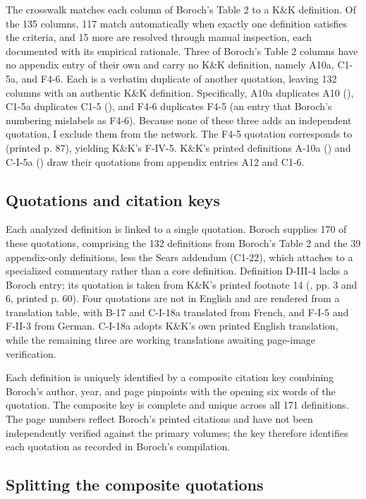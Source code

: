 \documentclass[11pt]{article}
\begin{document}
The crosswalk matches each column of Boroch's Table 2 to a K\&K definition. Of the 135 columns, 117 match automatically when exactly one definition satisfies the criteria, and 15 more are resolved through manual inspection, each documented with its empirical rationale. Three of Boroch's Table 2 columns have no appendix entry of their own and carry no K\&K definition, namely A10a, C1-5a, and F4-6. Each is a verbatim duplicate of another quotation, leaving 132 columns with an authentic K\&K definition. Specifically, A10a duplicates A10 (\citealt{winston1933}), C1-5a duplicates C1-5 (\citealt{firth1939}), and F4-6 duplicates F4-5 (an entry that Boroch's numbering mislabels as F4-6). Because none of these three adds an independent quotation, I exclude them from the network. The F4-5 quotation corresponds to \citealt{kluckhohnkelly1945a} (printed p. 87), yielding K\&K's F-IV-5. K\&K's printed definitions A-10a (\citealt{lowie1937}) and C-I-5a (\citealt{lynd1940}) draw their quotations from appendix entries A12 and C1-6.

\subsection{Quotations and citation keys}

Each analyzed definition is linked to a single quotation. Boroch supplies 170 of these quotations, comprising the 132 definitions from Boroch's Table 2 and the 39 appendix-only definitions, less the Sears addendum (C1-22), which attaches to a specialized commentary rather than a core definition. Definition D-III-4 lacks a Boroch entry; its quotation is taken from K\&K's printed footnote 14 (\citealt{roberts1951}, pp. 3 and 6, printed p. 60). Four quotations are not in English and are rendered from a translation table, with B-17 and C-I-18a translated from French, and F-I-5 and F-II-3 from German. C-I-18a adopts K\&K's own printed English translation, while the remaining three are working translations awaiting page-image verification.

Each definition is uniquely identified by a composite citation key combining Boroch's author, year, and page pinpoints with the opening six words of the quotation. The composite key is complete and unique across all 171 definitions. The page numbers reflect Boroch's printed citations and have not been independently verified against the primary volumes; the key therefore identifies each quotation as recorded in Boroch's compilation.

\subsection{Splitting the composite quotations}
\end{document}
